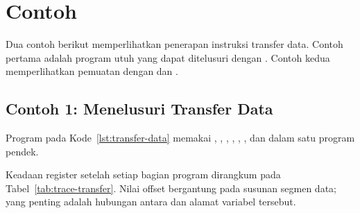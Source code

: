 \section{Contoh}
\label{sec:contoh-bab8}

Dua contoh berikut memperlihatkan penerapan instruksi transfer data.
Contoh pertama adalah program utuh yang dapat ditelusuri dengan
. Contoh kedua memperlihatkan pemuatan
 dengan  dan .

\subsection{Contoh 1: Menelusuri Transfer Data}

Program pada Kode~\ref{lst:transfer-data} memakai ,
, , , , , dan
 dalam satu program pendek.



Keadaan register setelah setiap bagian program dirangkum pada
Tabel~\ref{tab:trace-transfer}. Nilai offset 
bergantung pada susunan segmen data; yang penting adalah hubungan
antara  dan alamat variabel tersebut.

